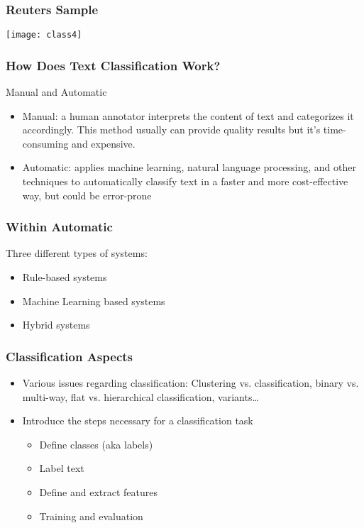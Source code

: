 \begin{frame}[fragile]
  \frametitle{Reuters Sample}
\begin{center}
\texttt{[image: class4]}
\end{center}
\end{frame}

\begin{frame}[fragile]
  \frametitle{How Does Text Classification Work?}
Manual and Automatic 
\begin{itemize}
\item Manual: a human annotator interprets the content of text and categorizes it accordingly. This method usually can provide quality results but it’s time-consuming and expensive. 
\item Automatic: applies machine learning, natural language processing, and other techniques to automatically classify text in a faster and more cost-effective way, but could be error-prone
\end{itemize}
\end{frame}

\begin{frame}[fragile]
  \frametitle{Within Automatic}
Three different types of systems:
\begin{itemize}
\item Rule-based systems
\item Machine Learning based systems
\item Hybrid systems
\end{itemize}
\end{frame}


\begin{frame}[fragile]
  \frametitle{Classification Aspects}
\begin{itemize}
\item Various issues regarding classification: Clustering vs. classification, binary vs. multi-way, flat vs. hierarchical classification, variants…
\item Introduce the steps necessary for a classification task
\begin{itemize}
\item Define classes (aka labels)
\item Label text
\item Define and extract features
\item Training and evaluation
\end{itemize}
\end{itemize}
\end{frame}


